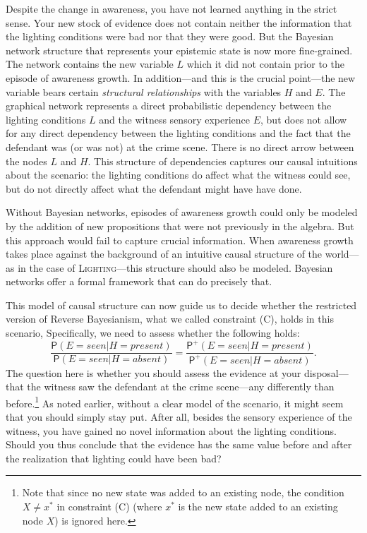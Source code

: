 \documentclass[
  11pt,
  dvipsnames,enabledeprecatedfontcommands]{scrartcl}
\newcommand{\pr}[1]{\ensuremath{\mathsf{P}(#1)}}
\newcommand{\ppr}[2]{\ensuremath{\mathsf{P}^{#1}(#2)}}
\begin{document}
Despite the change in awareness, you have not learned anything in the
strict sense. Your new stock of evidence does not contain neither the
information that the lighting conditions were bad nor that they were
good. But the Bayesian network structure that represents your epistemic
state is now more fine-grained. The network contains the new variable
\(L\) which it did not contain prior to the episode of awareness growth.
In addition---and this is the crucial point---the new variable bears
certain \emph{structural relationships} with the variables \(H\) and
\(E\). The graphical network represents a direct probabilistic
dependency between the lighting conditions \(L\) and the witness sensory
experience \(E\), but does not allow for any direct dependency between
the lighting conditions and the fact that the defendant was (or was not)
at the crime scene. There is no direct arrow between the nodes \(L\) and
\(H\). This structure of dependencies captures our causal intuitions
about the scenario: the lighting conditions do affect what the witness
could see, but do not directly affect what the defendant might have have
done.

Without Bayesian networks, episodes of awareness growth could only be
modeled by the addition of new propositions that were not previously in
the algebra. But this approach would fail to capture crucial
information. When awareness growth takes place against the background of
an intuitive causal structure of the world---as in the case of
\textsc{Lighting}---this structure should also be modeled. Bayesian
networks offer a formal framework that can do precisely that.

This model of causal structure can now guide us to decide whether the
restricted version of Reverse Bayesianism, what we called constraint
(C), holds in this scenario, Specifically, we need to assess whether the
following holds:
\[\frac{\pr{E=seen \vert H=present}}{\pr{E=seen \vert H=absent}}= \frac{\ppr{+}{E=seen \vert H=present}}{\ppr{+}{E=seen \vert H=absent}}.\]
The question here is whether you should assess the evidence at your
disposal---that the witness saw the defendant at the crime scene---any
differently than before.\footnote{Note that since no new state was added
  to an existing node, the condition \(X\neq x^*\) in constraint (C)
  (where \(x^*\) is the new state added to an existing node \(X\)) is
  ignored here.} As noted earlier, without a clear model of the
scenario, it might seem that you should simply stay put. After all,
besides the sensory experience of the witness, you have gained no novel
information about the lighting conditions. Should you thus conclude that
the evidence has the same value before and after the realization that
lighting could have been bad?
\end{document}
